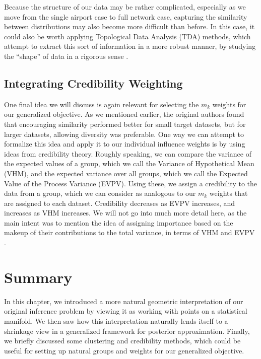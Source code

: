 Because the structure of our data may be rather complicated, especially as we move from the single airport case to full network case, capturing the similarity between distributions may also become more difficult than before. In this case, it could also be worth applying Topological Data Analysis (TDA) methods, which attempt to extract this sort of information in a more robust manner, by studying the ``shape'' of data in a rigorous sense \cite{chazal2021introductiontopologicaldataanalysis}.

\subsection{Integrating Credibility Weighting}

One final idea we will discuss is again relevant for selecting the $m_k$ weights for our generalized \CALNF{} objective. As we mentioned earlier, the original authors found that encouraging similarity performed better for small target datasets, but for larger datasets, allowing diversity was preferable. One way we can attempt to formalize this idea and apply it to our individual influence weights is by using ideas from credibility theory. Roughly speaking, we can compare the variance of the expected values of a group, which we call the Variance of Hypothetical Mean (VHM), and the expected variance over all groups, which we call the Expected Value of the Process Variance (EVPV). Using these, we assign a credibility to the data from a group, which we can consider as analogous to our $m_k$ weights that are assigned to each dataset. Credibility decreases as EVPV increases, and increases as VHM increases. We will not go into much more detail here, as the main intent was to mention the idea of assigning importance based on the makeup of their contributions to the total variance, in terms of VHM and EVPV \cite{Buhlmann_1967}.

\section{Summary}

In this chapter, we introduced a more natural geometric interpretation of our original inference problem by viewing it as working with points on a statistical manifold. We then saw how this interpretation naturally lends itself to a shrinkage view in a generalized \CALNF{} framework for posterior approximation. Finally, we briefly discussed some clustering and credibility methods, which could be useful for setting up natural groups and weights for our generalized \CALNF{} objective.